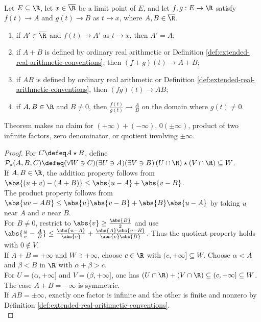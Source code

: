 \begin{theorem} \label{thm:extended-limit-algebra} \\
Let $E\subseteq\R$, let $x\in\overline{\R}$ be a limit point of $E$, and let $f,g:E\to\R$ satisfy $f(t)\to A$ and $g(t)\to B$ as $t\to x$, where $A,B\in\overline{\R}$.
\begin{enumerate}[label=(\roman*)]
\setlength{\itemsep}{0pt}
\item if $A'\in\overline{\R}$ and $f(t)\to A'$ as $t\to x$, then $A'=A$;
\item if $A+B$ is defined by ordinary real arithmetic or Definition \ref{def:extended-real-arithmetic-conventions}, then $(f+g)(t)\to A+B$;
\item if $AB$ is defined by ordinary real arithmetic or Definition \ref{def:extended-real-arithmetic-conventions}, then $(fg)(t)\to AB$;
\item if $A,B\in\R$ and $B\neq0$, then $\frac{f(t)}{g(t)}\to\frac{A}{B}$ on the domain where $g(t)\neq0$.
\end{enumerate}
Theorem makes no claim for $(+\infty)+(-\infty)$, $0(\pm\infty)$, product of two infinite factors, zero denominator, or quotient involving $\pm\infty$.
\begin{proof}
For $C\defeq A\star B$, define $\mathcal{P}_\star(A,B,C)\defeq(\forall W\ni C)(\exists U\ni A)(\exists V\ni B)\,(U\cap\R)\star(V\cap\R)\subseteq W$.\\
If $A,B\in\R$, the addition property follows from $\abs{(u+v)-(A+B)}\leq\abs{u-A}+\abs{v-B}$.\\
The product property follows from $\abs{uv-AB}\leq\abs{u}\abs{v-B}+\abs{B}\abs{u-A}$ by taking $u$ near $A$ and $v$ near $B$.\\
For $B\neq0$, restrict to $\abs{v}\geq\frac{\abs{B}}{2}$ and use $\abs{\frac{u}{v}-\frac{A}{B}}\leq\frac{\abs{u-A}}{\abs{v}}+\frac{\abs{A}\abs{v-B}}{\abs{v}\abs{B}}$. Thus the quotient property holds with $0\notin V$.\\
If $A+B=+\infty$ and $W\ni+\infty$, choose $c\in\R$ with $(c,+\infty]\subseteq W$. Choose $\alpha<A$ and $\beta<B$ in $\R$ with $\alpha+\beta>c$.\\
For $U=(\alpha,+\infty]$ and $V=(\beta,+\infty]$, one has $(U\cap\R)+(V\cap\R)\subseteq(c,+\infty]\subseteq W$. The case $A+B=-\infty$ is symmetric.\\
If $AB=\pm\infty$, exactly one factor is infinite and the other is finite and nonzero by Definition \ref{def:extended-real-arithmetic-conventions}.\\

\end{proof}
\end{theorem}
